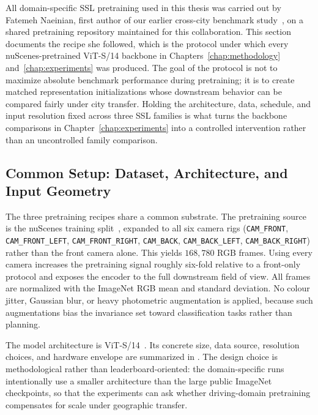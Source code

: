 All domain-specific SSL pretraining used in this thesis was carried out by Fatemeh Naeinian, first author of our earlier cross-city benchmark study~\cite{naeinian-cross-city-2026}, on a shared pretraining repository maintained for this collaboration. This section documents the recipe she followed, which is the protocol under which every nuScenes-pretrained ViT-S/14 backbone in Chapters~\ref{chap:methodology} and~\ref{chap:experiments} was produced. The goal of the protocol is not to maximize absolute benchmark performance during pretraining; it is to create matched representation initializations whose downstream behavior can be compared fairly under city transfer. Holding the architecture, data, schedule, and input resolution fixed across three SSL families is what turns the backbone comparisons in Chapter~\ref{chap:experiments} into a controlled intervention rather than an uncontrolled family comparison.

\subsection{Common Setup: Dataset, Architecture, and Input Geometry}
\label{sec:meth-ssl-common}

The three pretraining recipes share a common substrate. The pretraining source is the nuScenes training split~\cite{caesar-nuscenes-2020}, expanded to all six camera rigs (\texttt{CAM\_FRONT}, \texttt{CAM\_FRONT\_LEFT}, \texttt{CAM\_FRONT\_RIGHT}, \texttt{CAM\_BACK}, \texttt{CAM\_BACK\_LEFT}, \texttt{CAM\_BACK\_RIGHT}) rather than the front camera alone. This yields \(168{,}780\) RGB frames. Using every camera increases the pretraining signal roughly six-fold relative to a front-only protocol and exposes the encoder to the full downstream field of view. All frames are normalized with the ImageNet RGB mean and standard deviation. No colour jitter, Gaussian blur, or heavy photometric augmentation is applied, because such augmentations bias the invariance set toward classification tasks rather than planning.

The model architecture is ViT-S/14~\cite{dosovitskiy-vit-2021}. Its concrete size, data source, resolution choices, and hardware envelope are summarized in . The design choice is methodological rather than leaderboard-oriented: the domain-specific runs intentionally use a smaller architecture than the large public ImageNet checkpoints, so that the experiments can ask whether driving-domain pretraining compensates for scale under geographic transfer.

